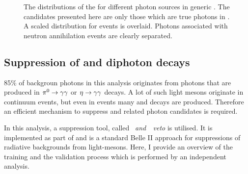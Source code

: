 \begin{figure}[htbp!]
    \centering
    \caption{\label{fig:zmva_distribution_sources} The distributions of the \ZMVA for different photon sources in generic \MC.
    The candidates presented here are only those which are true photons in .
    A scaled \ZMVA distribution for \BtoXsgamma events is overlaid.
    Photons associated with neutron annihilation events are clearly separated.}
\end{figure}

\subsection{Suppression of \texorpdfstring{\piz}{pi0} and \texorpdfstring{\eta}{eta} diphoton decays}\label{sec:selection_vetos}

85\% of backgroun photons in this analysis originates from photons that are produced in $\pi^0\rightarrow\gamma\gamma$ or $\eta\rightarrow\gamma\gamma$ decays.
A lot of such light mesons originate in continuum events, but even in \BB events many \piz and \eta decays are produced.
Therefore an efficient mechanism to suppress \piz and \eta related photon candidates is required.

In this analysis, a suppression tool, called \textit{\piz~and~\eta~veto} is utilised.
It is implemented as part of \basftwo and is a standard Belle II approach for suppressions of radiative backgrounds from light-mesons.
Here, I provide an overview of the training and the validation process which is performed by an independent analysis.

